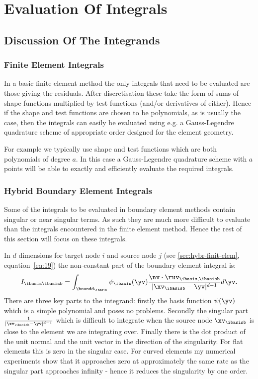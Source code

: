 
\chapter{Evaluation Of Integrals}

\section{Discussion Of The Integrands}

\subsection{Finite Element Integrals}

In a basic finite element method the only integrals that need to be evaluated are those giving the residuals. After discretisation these take the form of sums of shape functions multiplied by test functions (and/or derivatives of either). Hence if the shape and test functions are chosen to be polynomials, as is usually the case, then the integrals can easily be evaluated using e.g. a Gauss-Legendre quadrature scheme of appropriate order designed for the element geometry.\cite{??ds: Gauss-Legendre schemes for arbitrary geometry, Milan gave Mousavi2010 but it is more about polygons with large numbers of sides not 3D ones}

For example we typically use shape and test functions which are both polynomials of degree $a$. In this case a Gauss-Legendre quadrature scheme with $a$ points  will be able to exactly and efficiently evaluate the required integrals.

\subsection{Hybrid Boundary Element Integrals}

Some of the integrals to be evaluated in boundary element methods contain singular or near singular terms. As such they are much more difficult to evaluate than the integrals encountered in the finite element method. Hence the rest of this section will focus on these integrals.

In $d$ dimensions for target node $i$ and source node $j$ (see \autoref{sec:hybr-finit-elem}, equation~\eqref{eq:19}) the non-constant part of the boundary element integral is:
\begin{equation}
  \label{eq:7}
   I_{\ibasis\ibasisb} = \int_{\boundd_\ibasis} \psi_\ibasis(\yv) \frac{\nv \cdot \ruv_{\ibasis,\ibasisb}}{| \xv_\ibasisb - \yv| ^{d-1}} d\yv.
\end{equation}
There are three key parts to the integrand: firstly the basis function $\psi(\yv)$ which is a simple polynomial and poses no problems. Secondly the singular part $ \frac{1}{|\xv_\ibasisb - \yv| ^{d-1}}$ which is difficult to integrate when the source node $\xv_\ibasisb$ is close to the element we are integrating over. Finally there is the dot product of the unit normal and the unit vector in the direction of the singularity. For flat elements this is zero in the singular case. For curved elements my numerical experiments show that it approaches zero at approximately the same rate as the singular part approaches infinity - hence it reduces the singularity by one order.

